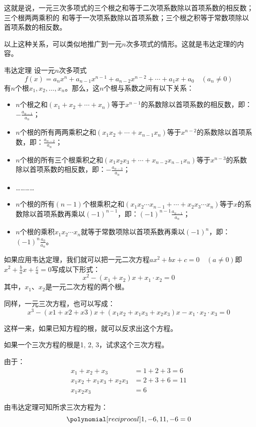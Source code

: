 这就是说，一元三次多项式的三个根之和等于二次项系数除以首项系数的相反数；三个根两两乘积的
和等于一次项系数除以首项系数；三个根之积等于常数项除以首项系数的相反数。

以上这种关系，可以类似地推广到一元$n$次多项式的情形。这就是韦达定理的内容。

\begin{blk}{韦达定理}
设一元$n$次多项式$$f(x)=a_nx^n+a_{n-1}x^{n-1}+a_{n-2}x^{n-2}+\cdots+a_1x+a_0\quad (a_n\ne 0)$$
有$n$个根$x_1,x_2,\ldots,x_n$。那么，这$n$个根与系数之间有以下关系：
\begin{itemize}
    \item $n$个根之和$(x_1+x_2+\cdots+x_n)$等于$x^{n-1}$的系数除以首项系数的相反数，即：$
    -\frac{a_{n-1}}{a_n}$；
    \item $n$个根的所有两两乘积之和$(x_1x_2+\cdots+x_{n-1}x_n)$等于$x^{n-2}$的系数除以首项系数，即：$
    \frac{a_{n-2}}{a_n}$；
    \item $n$个根的所有三个根乘积之和$(x_1x_2x_3+\cdots+x_{n-2}x_{n-1}x_n)$等于$x^{n-3}$的系数除以首项系数的相反数，即：$-\frac{a_{n-3}}{a_n}$；
    \item …………
    \item $n$个根的所有$(n-1)$个根乘积之和$(x_1x_2\cdots x_{n-1} +\cdots+ x_2x_3\cdots x_n)$等于$x$的系数除以首项系数再乘以$(-1)^{n-1}$，即：$ (-1)^{n-1}\frac{a_{n-1}}{a_n}$；
    \item $n$个根的乘积$x_1x_2\cdots x_n$就等于常数项除以首项系数再乘以$(-1)^{n}$，即：$ (-1)^{n}\frac{a_{0}}{a_n}$。
\end{itemize}
\end{blk}

如果应用韦达定理，我们就可以把一元二次方程$ax^2+bx+c=0\quad (a\ne 0)$即 $x^2+\frac{b}{a}x+\frac{c}{a}=0$写成以下形式：
\[x^2- (x_1+x_2) x+x_1\cdot x_2=0\]
其中，$x_1$、$x_2$是一元二次方程的两个根。

同样，一元三次方程，也可以写成：
\[x^3- (x1+x2+x3) x+ (x_1x_2+x_1x_3+x_2x_3) x
-x_1\cdot x_2\cdot x_3=0\]

这样一来，如果已知方程的根，就可以反求出这个方程。

\begin{example}
    如果一个三次方程的根是1, 2, 3，试求这个三次方程。
\end{example}

\begin{solution}
由于：\[\begin{split}
    x_1+x_2+x_3 &=1+2+3=6\\
    x_1x_2+x_1x_3+x_2x_3&=2+3+6=11\\
    x_1x_2x_3&=6
\end{split}\]

由韦达定理可知所求三次方程为：
\[\poly{1,-6,11,-6}=0\]
\end{solution}

